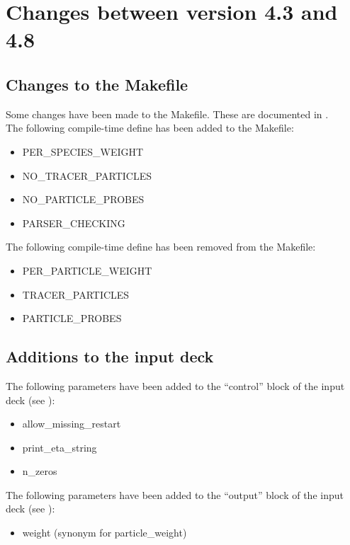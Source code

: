 \section{Changes between version 4.3 and 4.8}

\subsection{Changes to the Makefile}

Some changes have been made to the Makefile. These are documented in
.\\

\noindent The following compile-time define has been added to the Makefile:
\begin{itemize}
\item PER\_SPECIES\_WEIGHT
\item NO\_TRACER\_PARTICLES
\item NO\_PARTICLE\_PROBES
\item PARSER\_CHECKING
\end{itemize}
\bigskip

\noindent The following compile-time define has been removed from the Makefile:
\begin{itemize}
\item PER\_PARTICLE\_WEIGHT
\item TRACER\_PARTICLES
\item PARTICLE\_PROBES
\end{itemize}


\subsection{Additions to the input deck}
The following parameters have been added to the ``control'' block of
the input deck (see ):
\begin{itemize}
\item allow\_missing\_restart
\item print\_eta\_string
\item n\_zeros
\end{itemize}
\bigskip

\noindent The following parameters have been added to the ``output'' block of
the input deck (see ):
\begin{itemize}
\item weight (synonym for particle\_weight)
\end{itemize}
\bigskip

